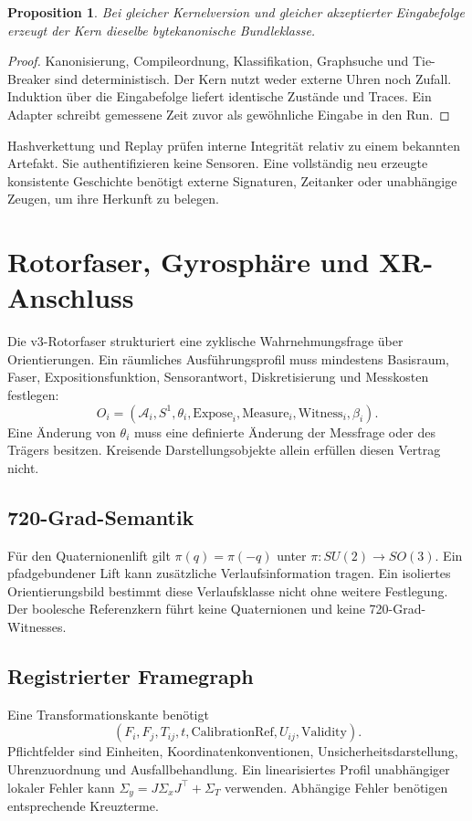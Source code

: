 \documentclass[11pt,a4paper]{article}
\newcommand{\nextsection}[2]{\clearpage{\color{accent}\small\textsf{#1}}\section{#2}}
\newtheorem{proposition}{Proposition}[section]
\begin{document}
\begin{proposition}
Bei gleicher Kernelversion und gleicher akzeptierter Eingabefolge
erzeugt der Kern dieselbe bytekanonische Bundleklasse.
\end{proposition}
\begin{proof}
Kanonisierung, Compileordnung, Klassifikation, Graphsuche und
Tie-Breaker sind deterministisch. Der Kern nutzt weder externe Uhren
noch Zufall. Induktion über die Eingabefolge liefert identische
Zustände und Traces. Ein Adapter schreibt gemessene Zeit zuvor als
gewöhnliche Eingabe in den Run.
\end{proof}

Hashverkettung und Replay prüfen interne Integrität relativ zu einem
bekannten Artefakt. Sie authentifizieren keine Sensoren. Eine vollständig
neu erzeugte konsistente Geschichte benötigt externe Signaturen,
Zeitanker oder unabhängige Zeugen, um ihre Herkunft zu belegen.

\nextsection{13 / PHYSISCHER TRÄGER}{Rotorfaser, Gyrosphäre und XR-Anschluss}
Die v3-Rotorfaser strukturiert eine zyklische Wahrnehmungsfrage über
Orientierungen. Ein räumliches Ausführungsprofil muss mindestens
Basisraum, Faser, Expositionsfunktion, Sensorantwort, Diskretisierung
und Messkosten festlegen:
\[
O_i=(\mathcal A_i,S^1,\theta_i,\mathrm{Expose}_i,
\mathrm{Measure}_i,\mathrm{Witness}_i,\beta_i).
\]
Eine Änderung von $\theta_i$ muss eine definierte Änderung der
Messfrage oder des Trägers besitzen. Kreisende Darstellungsobjekte
allein erfüllen diesen Vertrag nicht.

\subsection{720-Grad-Semantik}
Für den Quaternionenlift gilt
$\pi(q)=\pi(-q)$ unter $\pi:SU(2)\to SO(3)$.
Ein pfadgebundener Lift kann zusätzliche Verlaufsinformation tragen.
Ein isoliertes Orientierungsbild bestimmt diese Verlaufsklasse
nicht ohne weitere Festlegung. Der boolesche Referenzkern
führt keine Quaternionen und keine 720-Grad-Witnesses.

\subsection{Registrierter Framegraph}
Eine Transformationskante benötigt
\[
(F_i,F_j,T_{ij},t,\mathrm{CalibrationRef},U_{ij},\mathrm{Validity}).
\]
Pflichtfelder sind Einheiten, Koordinatenkonventionen,
Unsicherheitsdarstellung, Uhrenzuordnung und Ausfallbehandlung.
Ein linearisiertes Profil unabhängiger lokaler Fehler kann
$\Sigma_y=J\Sigma_xJ^\top+\Sigma_T$ verwenden.
Abhängige Fehler benötigen entsprechende Kreuzterme.
\end{document}
